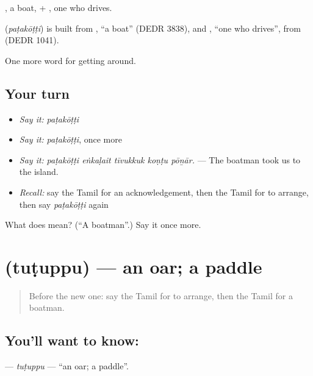 , a boat, + , one who drives.

\begin{cousinweb}
\textbf{} (\emph{paṭakōṭṭi}) is built from , \textquotedblleft{}a boat\textquotedblright{} (DEDR 3838), and , \textquotedblleft{}one who drives\textquotedblright{}, from  (DEDR 1041).
\end{cousinweb}

\begin{grammarlens}[title={What you've built}]
One more word for getting around.
\end{grammarlens}

\subsection*{Your turn}
\begin{itemize}
\raggedright
  \item \emph{Say it:} \emph{paṭakōṭṭi}
  \item \emph{Say it:} \emph{paṭakōṭṭi}, once more
  \item \emph{Say it:} \emph{paṭakōṭṭi eṅkaḷait tīvukkuk koṇṭu pōṉār.} — The boatman took us to the island.
  \item \emph{Recall:} say the Tamil for an acknowledgement, then the Tamil for to arrange, then say \emph{paṭakōṭṭi} again
\end{itemize}

\begin{tcolorbox}[breakable,colback=teal!4,colframe=teal!35!black,title={Before you move on}]
What does  mean? (\textquotedblleft{}A boatman\textquotedblright{}.) Say it once more.
\end{tcolorbox}
\section[\texorpdfstring{\ta{துடுப்பு} (tuṭuppu)}{துடுப்பு (tuṭuppu)}]{ (tuṭuppu) — an oar; a paddle}

\label{lesson:TA-C416-tutuppu}



\begin{quote}
Before the new one: say the Tamil for to arrange, then the Tamil for a boatman.
\end{quote}

\subsection*{You'll want to know: }
\textbf{} — \emph{tuṭuppu} — \textquotedblleft{}an oar; a paddle\textquotedblright{}.


